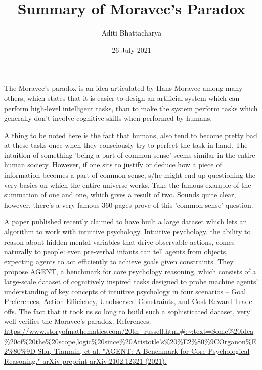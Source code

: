 \documentclass{article}
\title{Summary of Moravec's Paradox}
\author{Aditi Bhattacharya}
\date{26 July 2021}
\begin{document}
\maketitle
\begin{sloppypar}
The Moravec's paradox is an idea articulated by Hans Moravec among many others, which states that it is easier to design an artificial system which can perform high-level intelligent tasks, than to make the system perform tasks which generally don't involve cognitive skills when performed by humans.
 \par

A thing to be noted here is the fact that humans, also tend to become pretty bad at these tasks once when they consciously try to perfect the task-in-hand. The intuition of something 'being a part of common sense' seems similar in the entire human society. However, if one sits to justify or deduce how a piece of information becomes a part of common-sense, s/he might end up questioning the very basics on which the entire universe works. Take the famous example of the summation of one and one, which gives a result of two. Sounds quite clear, however, there's a very famous 360 pages prove of this 'common-sense' question.

A paper published recently claimed to have built a large dataset which lets an algorithm to work with intuitive psychology. Intuitive psychology, the ability to reason about
hidden mental variables that drive observable actions, comes naturally to people: even pre-verbal infants can tell agents from objects, expecting agents to act efficiently to achieve goals given constraints. They propose AGENT, a benchmark for core psychology reasoning, which consists of a large-scale dataset of cognitively inspired tasks designed to probe machine agents’ understanding of key concepts of intuitive psychology in four scenarios – Goal Preferences, Action Efficiency, Unobserved Constraints, and Cost-Reward Trade-offs. The fact that it took us so long to build such a sophisticated dataset, very well verifies the Moravec's paradox. 
\newline
\newline
References:
\newline
\url {https://www.storyofmathematics.com/20th\_russell.html\#:\~:text=Some\%20idea\%20of\%20the\%20scope,logic\%20since\%20Aristotle's\%20\%E2\%80\%9COrganon\%E2\%80\%9D
}
\newline
\url{Shu, Tianmin, et al. "AGENT: A Benchmark for Core Psychological Reasoning." arXiv preprint arXiv:2102.12321 (2021).
}
\end{sloppypar}
\end{document}
